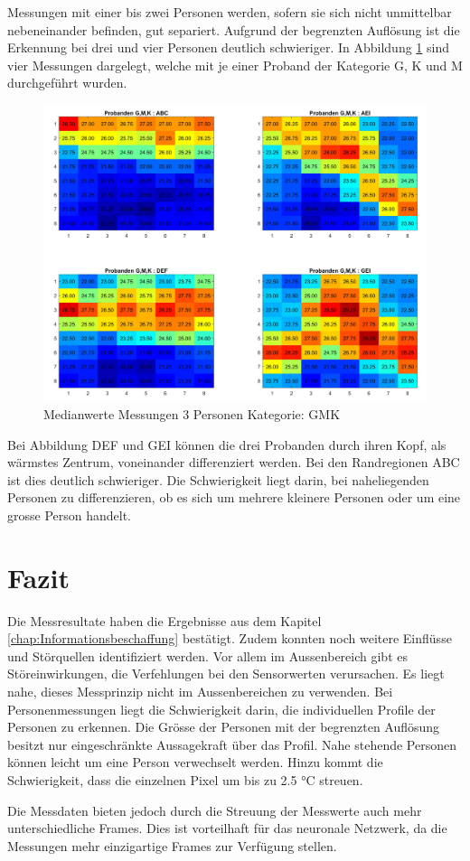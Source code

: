 Messungen mit einer bis zwei Personen werden, sofern sie sich nicht unmittelbar nebeneinander befinden, gut separiert. 
Aufgrund der begrenzten Auflösung ist die Erkennung bei drei und vier Personen deutlich schwieriger. In Abbildung \ref{fig:p33x3allpositons} sind vier Messungen dargelegt, welche mit je einer Proband der Kategorie G, K und M durchgeführt wurden.

\begin{figure}[H]
	\centering
	\includegraphics[width=0.8\linewidth]{fig/p3_kkg_4x4.jpg}
	\caption[Medianwerte aus Messungen mit 3 Personen der Kategorie: GMK]{Medianwerte Messungen 3 Personen Kategorie: GMK}
	\label{fig:p33x3allpositons}
\end{figure}


Bei Abbildung DEF und GEI können die drei Probanden durch ihren Kopf, als wärmstes Zentrum, voneinander differenziert werden. Bei den Randregionen ABC ist dies deutlich schwieriger. Die Schwierigkeit liegt darin, bei naheliegenden Personen zu differenzieren, ob es sich um mehrere kleinere Personen oder um eine grosse Person handelt.


\section{Fazit}
Die Messresultate haben die Ergebnisse aus dem Kapitel \ref{chap:Informationsbeschaffung} bestätigt. Zudem konnten noch weitere Einflüsse und Störquellen identifiziert werden. Vor allem im Aussenbereich gibt es Störeinwirkungen, die Verfehlungen bei den Sensorwerten verursachen. Es liegt nahe, dieses Messprinzip nicht im Aussenbereichen zu verwenden.
Bei Personenmessungen liegt die Schwierigkeit darin, die individuellen Profile der Personen zu erkennen. Die Grösse der Personen mit der begrenzten Auflösung besitzt nur eingeschränkte Aussagekraft über das Profil. Nahe stehende Personen können leicht um eine Person verwechselt werden. Hinzu kommt die Schwierigkeit, dass die einzelnen Pixel um bis zu 2.5 °C streuen. 

Die Messdaten bieten jedoch durch die Streuung der Messwerte auch mehr unterschiedliche Frames. Dies ist vorteilhaft für das neuronale Netzwerk, da die Messungen mehr einzigartige Frames zur Verfügung stellen.